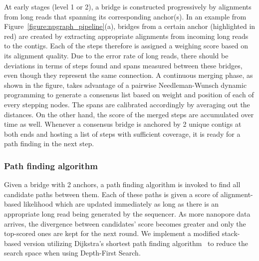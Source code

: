 \documentclass[10pt,letterpaper]{article}
\begin{document}

At early stages (level 1 or 2), a bridge is constructed progressively by alignments from long reads that spanning its corresponding anchor(s).
In an example from Figure~\ref{figure:npgraph_pipeline}(a), bridges from a certain anchor (highlighted in red) are created by extracting appropriate alignments from incoming long reads to the contigs. Each of the steps therefore is assigned a weighing score based on its alignment quality.
Due to the error rate of long reads, there should be deviations in terms of steps found and spans measured between these bridges, even though they represent the same connection.
A continuous merging phase, as shown in the figure, takes advantage of a pairwise Needleman-Wunsch dynamic programming to generate a consensus list based on weight and position of each of every stepping nodes. The spans are calibrated accordingly by averaging out the distances. On the other hand, the score of the merged steps are accumulated over time as well.
Whenever a consensus bridge is anchored by 2 unique contigs at both ends and hosting a list of steps with sufficient coverage, it is ready for a path finding in the next step.


\subsubsection*{Path finding algorithm}
Given a bridge with 2 anchors, a path finding algorithm is invoked to find all candidate paths between them. Each of these paths is given a score of alignment-based likelihood which are updated immediately as long as there is an appropriate long read being generated by the sequencer. As more nanopore data arrives, the divergence between candidates' score becomes greater and only the top-scored ones are kept for the next round.
We implement a modified stack-based version utilizing Dijkstra's shortest path finding algorithm~\cite{Dijkstra1959} to reduce the search space when using Depth-First Search.
\end{document}
